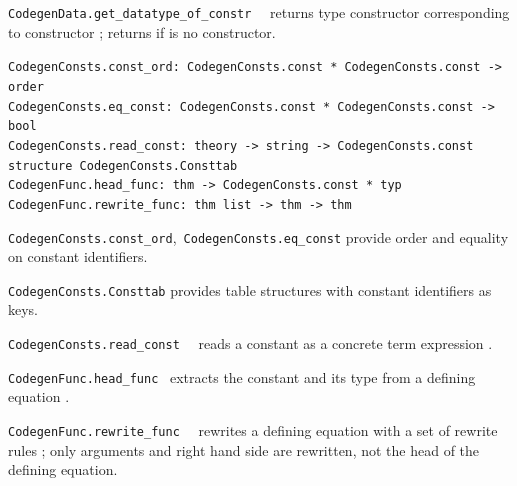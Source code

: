 \begin{isabellebody}
\begin{isamarkuptext}
\begin{description}
  \item \verb|CodegenData.get_datatype_of_constr|~~
     returns type constructor corresponding to
     constructor ; returns 
     if  is no constructor.

  \end{description}%
\end{isamarkuptext}%
\isamarkuptrue%
%
\endisatagmlref
{\isafoldmlref}%
%
\isadelimmlref
%
\endisadelimmlref
%
\isamarkuptrue%
%
\isadelimmlref
%
\endisadelimmlref
%
\isatagmlref
%
\begin{isamarkuptext}%
\begin{mldecls}
  \verb|CodegenConsts.const_ord: CodegenConsts.const * CodegenConsts.const -> order| \\
  \verb|CodegenConsts.eq_const: CodegenConsts.const * CodegenConsts.const -> bool| \\
  \verb|CodegenConsts.read_const: theory -> string -> CodegenConsts.const| \\
  \verb|structure CodegenConsts.Consttab| \\
  \verb|CodegenFunc.head_func: thm -> CodegenConsts.const * typ| \\
  \verb|CodegenFunc.rewrite_func: thm list -> thm -> thm| \\
  \end{mldecls}

  \begin{description}

  \item \verb|CodegenConsts.const_ord|,~\verb|CodegenConsts.eq_const|
     provide order and equality on constant identifiers.

  \item \verb|CodegenConsts.Consttab|
     provides table structures with constant identifiers as keys.

  \item \verb|CodegenConsts.read_const|~~
     reads a constant as a concrete term expression .

  \item \verb|CodegenFunc.head_func|~
     extracts the constant and its type from a defining equation .

  \item \verb|CodegenFunc.rewrite_func|~~
     rewrites a defining equation  with a set of rewrite
     rules ; only arguments and right hand side are rewritten,
     not the head of the defining equation.


\end{description}
\end{isamarkuptext}
\end{isabellebody}
